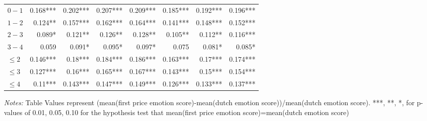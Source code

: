 \documentclass[]{article}
\begin{document}
\begin{table}[!htb]
\begin{tabular}{lrrrrrrr}
\cmidrule(lr){1-1} \cmidrule(lr){2-8}
$0-1$ & 0.168***  & 0.202***  & 0.207***  & 0.209***  & 0.185***  & 0.192***  & 0.196***  \\ 
  $1-2$ & 0.124**   & 0.157***  & 0.162***  & 0.164***  & 0.141***  & 0.148***  & 0.152***  \\ 
  $2-3$ & 0.089*    & 0.121**   & 0.126**   & 0.128**   & 0.105**   & 0.112**   & 0.116***  \\ 
  $3-4$ & 0.059     & 0.091*    & 0.095*    & 0.097*    & 0.075     & 0.081*    & 0.085*    \\ 
$\leq 2$ & 0.146***  & 0.18***   & 0.184***  & 0.186***  & 0.163***  & 0.17***   & 0.174***  \\ 
$\leq 3$ & 0.127***  & 0.16***   & 0.165***  & 0.167***  & 0.143***  & 0.15***   & 0.154***  \\ 
$\leq 4$ & 0.11***   & 0.143***  & 0.147***  & 0.149***  & 0.126***  & 0.133***  & 0.137***  \\ 
\bottomrule 

\end{tabular} 

\begin{minipage}{\textwidth}
\footnotesize
\vspace{0.25cm}
\emph{Notes:} Table Values represent (mean(first price emotion score)-mean(dutch emotion score))/mean(dutch emotion score). ***, **, *, for p-values of 0.01, 0.05, 0.10 for the hypothesis test that mean(first price emotion score)=mean(dutch emotion score)
\end{minipage}
\endgroup
\end{table}
\end{document}
